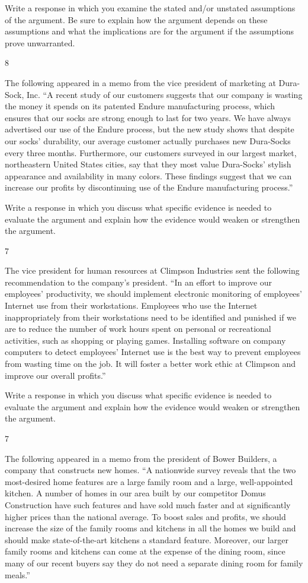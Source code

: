 \documentclass[]{article}
\begin{document}
Write a response in which you examine the stated and/or unstated
assumptions of the argument. Be sure to explain how the argument depends
on these assumptions and what the implications are for the argument if
the assumptions prove unwarranted.

8

The following appeared in a memo from the vice president of marketing at
Dura-Sock, Inc. ``A recent study of our customers suggests that our
company is wasting the money it spends on its patented Endure
manufacturing process, which ensures that our socks are strong enough to
last for two years. We have always advertised our use of the Endure
process, but the new study shows that despite our socks' durability, our
average customer actually purchases new Dura-Socks every three months.
Furthermore, our customers surveyed in our largest market, northeastern
United States cities, say that they most value Dura-Socks' stylish
appearance and availability in many colors. These findings suggest that
we can increase our profits by discontinuing use of the Endure
manufacturing process.''

Write a response in which you discuss what specific evidence is needed
to evaluate the argument and explain how the evidence would weaken or
strengthen the argument.

7

The vice president for human resources at Climpson Industries sent the
following recommendation to the company's president. ``In an effort to
improve our employees' productivity, we should implement electronic
monitoring of employees' Internet use from their workstations. Employees
who use the Internet inappropriately from their workstations need to be
identified and punished if we are to reduce the number of work hours
spent on personal or recreational activities, such as shopping or
playing games. Installing software on company computers to detect
employees' Internet use is the best way to prevent employees from
wasting time on the job. It will foster a better work ethic at Climpson
and improve our overall profits.''

Write a response in which you discuss what specific evidence is needed
to evaluate the argument and explain how the evidence would weaken or
strengthen the argument.

7

The following appeared in a memo from the president of Bower Builders, a
company that constructs new homes. ``A nationwide survey reveals that
the two most-desired home features are a large family room and a large,
well-appointed kitchen. A number of homes in our area built by our
competitor Domus Construction have such features and have sold much
faster and at significantly higher prices than the national average. To
boost sales and profits, we should increase the size of the family rooms
and kitchens in all the homes we build and should make state-of-the-art
kitchens a standard feature. Moreover, our larger family rooms and
kitchens can come at the expense of the dining room, since many of our
recent buyers say they do not need a separate dining room for family
meals.''
\end{document}
